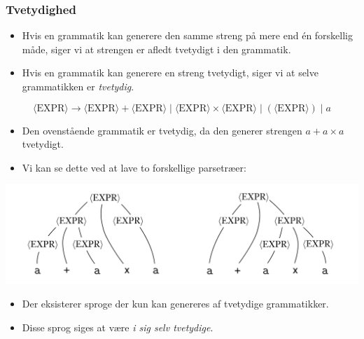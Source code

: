 \begin{frame}[allowframebreaks]
  \frametitle{Tvetydighed}

  \begin{itemize}
    \item Hvis en grammatik kan generere den samme streng på mere end én forskellig måde, siger vi at strengen er afledt tvetydigt i den grammatik.
    \item Hvis en grammatik kan generere en streng tvetydigt, siger vi at selve grammatikken er \textit{tvetydig}.
  \end{itemize}

  \begin{equation}
\langle \text{EXPR} \rangle \rightarrow \langle \text{EXPR} \rangle + \langle \text{EXPR} \rangle \mid \langle \text{EXPR} \rangle \times \langle \text{EXPR} \rangle \mid ( \langle \text{EXPR} \rangle ) \mid a
  \end{equation}

  \begin{itemize}
    \item Den ovenstående grammatik er tvetydig, da den generer strengen $a+a \times a$ tvetydigt.
    \item Vi kan se dette ved at lave to forskellige parsetræer:
  \end{itemize}

  \begin{center}
  \includegraphics[scale=0.3]{figur/figur26.png}
  \end{center}
  \begin{itemize}
    \item Der eksisterer sproge der kun kan genereres af tvetydige grammatikker.
    \item Disse sprog siges at være \textit{i sig selv tvetydige}.
  \end{itemize}
\end{frame}

